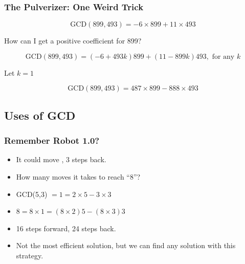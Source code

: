 \documentclass{beamer}
\begin{document}
\begin{frame}
  \frametitle{The Pulverizer: One Weird Trick}

  {\larger

    \begin{equation*}
    \text{GCD}(899, 493) = -6\times 899 + 11\times 493
    \end{equation*}

    How can I get a positive coefficient for 899?

    \begin{equation*}
      \text{GCD}(899, 493) = (-6 + 493k)899 + (11 - 899k)493, \text{ for any }k
    \end{equation*}

    Let $k = 1$

    \begin{equation*}
      \text{GCD}(899, 493) = 487\times 899 - 888\times 493
    \end{equation*}
    
  }
\end{frame}

\subsection{Uses of GCD}

\begin{frame}
  \frametitle{Remember Robot 1.0?}

  {\larger

    \begin{itemize}
    \item It could move , \alert{3 steps back}.
    \item How many moves it takes to reach ``8''?
    \item<2-> GCD(5,3) $= 1 = 2\times5 - 3\times 3$
    \item<3-> $8 = 8\times1 = (8\times2)5 - (8\times3) 3$
    \item<3-> 16 steps forward, 24 steps back.

      \bigskip

    \item <4-> Not the most efficient solution, but we can
      find any solution with this strategy.
    \end{itemize}
  }
\end{frame}
\end{document}
